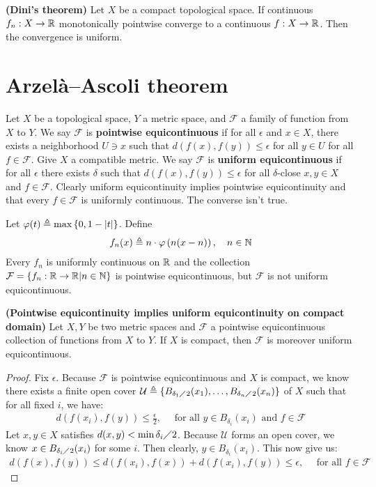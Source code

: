\documentclass{report}
\begin{document}
\begin{theorem}
\label{THDt}
\textbf{(Dini's theorem)} Let $X$ be a compact topological space. If continuous $f_n: X \rightarrow \mathbb{R}$ monotonically pointwise converge to a continuous $f:X\rightarrow \mathbb{R}$. Then the convergence is uniform.  
\end{theorem}

\section{Arzelà–Ascoli theorem}
Let $X$ be a topological space,  $Y$ a metric space, and $\mathcal{F}$ a family of function from $X$ to $Y$. We say  $\mathcal{F}$ is \textbf{pointwise equicontinuous} if for all $\epsilon $ and $x \in X$, there exists a neighborhood $U\ni x$ such that $d\left(f(x),f(y) \right)\leq \epsilon $ for all $y \in U$ for all $f \in \mathcal{F}$. Give $X$ a compatible metric. We say $\mathcal{F}$ is \textbf{uniform equicontinuous} if for all $\epsilon $ there exists $\delta$ such that $d \left(f(x),f(y) \right) \leq  \epsilon $ for all $\delta$-close $x,y \in X$ and $f \in \mathcal{F}$. Clearly uniform equicontinuity implies pointwise equicontinuity and that every $f \in \mathcal{F}$ is uniformly continuous. The converse isn't true. 
\begin{example}
Let $\varphi (t)\triangleq \max \left\{ 0, 1- \left|t\right| \right\}$. Define 
\begin{align*}
f_n(x)\triangleq n \cdot \varphi\left( n(x-n) \right) ,\quad n\in\mathbb{N}
\end{align*}
Every $f_n$ is uniformly continuous on $\mathbb{R}$ and the collection $\mathcal{F}=\left\{ f_n: \mathbb{R} \rightarrow \mathbb{R}| n\in\mathbb{N}  \right\}$ is pointwise equicontinuous, but $\mathcal{F}$ is not uniform equicontinuous. 
\end{example}
\begin{theorem}
\textbf{(Pointwise equicontinuity implies uniform equicontinuity on compact domain)} Let $X,Y$ be two metric spaces and $\mathcal{F}$ a pointwise equicontinuous collection of functions from $X$ to $Y$. If $X$ is compact, then $\mathcal{F}$ is moreover uniform equicontinuous. 
\end{theorem}
\begin{proof}
  Fix $\epsilon $. Because  $\mathcal{F}$ is pointwise equicontinuous and $X$ is compact, we know there exists a finite open cover  $\mathcal{U}\triangleq  \left\{ B_{\delta_1 \diagup 2}(x_1),\dots ,B_{ \delta_n \diagup 2}(x_n) \right\}$ of $X$ such that for all fixed $i$, we have: 
\begin{align*}
d\left(f(x_i),f(y) \right)  \leq \frac{\epsilon}{2},\quad \text{ for all }y \in B_{\delta_i}(x_i) \text{ and }f \in \mathcal{F} 
\end{align*}
Let $x,y \in X$ satisfies $d(x,y)< \min \delta_i \diagup 2$. Because $\mathcal{U}$ forms an open cover, we know $x \in B_{\delta_i \diagup 2}(x_i)$ for some $i$. Then clearly, $y \in B_{\delta_i}(x_i)$. This now give us: 
\begin{align*}
d\left(f(x),f(y) \right)\leq d\left(f(x_i),f(x) \right) + d\left(f(x_i),f(y) \right) \leq \epsilon ,\quad \text{ for all }f \in \mathcal{F} 
\end{align*}
\end{proof}
\end{document}
